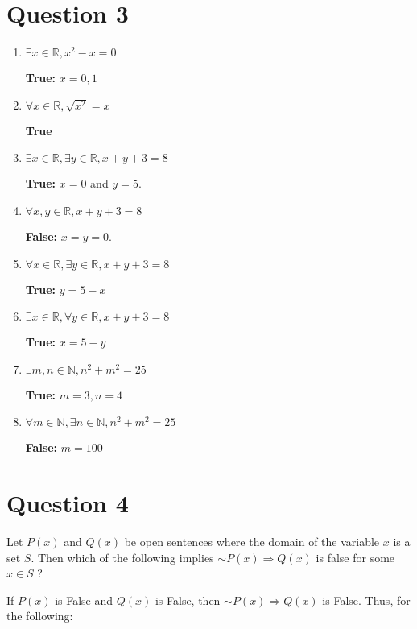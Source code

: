 \documentclass[11pt, oneside]{article}   	%
\begin{document}
\section*{Question 3}

\begin{enumerate}[ (a)]    

	\item $\exists x \in \mathbb{R}, x^2-x=0$
	
	\textbf{True:} $x=0, 1$
	
	\item $\forall x \in \mathbb{R}, \sqrt{x^2} = x$
	
	\textbf{True}
	
	\item $\exists x \in \mathbb{R}, \exists y \in \mathbb{R}, x+y+3=8$
	
	\textbf{True:} $x=0$ and  $y=5$.
	
	\item $\forall x,y \in \mathbb{R}, x+y+3=8$
	
	\textbf{False:} $x = y = 0$.
	
	\item$\forall x \in \mathbb{R}, \exists y \in \mathbb{R}, x+y+3=8$
	
	\textbf{True:} $y = 5-x$
	
	\item $\exists x \in \mathbb{R}, \forall y \in \mathbb{R}, x+y+3 =8$
	
	\textbf{True:} $x = 5-y$
	
	\item $\exists m,n \in \mathbb{N}, n^2+m^2 =25$
	
	\textbf{True:} $m=3, n=4$
	
	\item $\forall m \in \mathbb{N}, \exists n \in \mathbb{N}, n^2+m^2=25$
	
	\textbf{False:} $m=100$

\end{enumerate}

\section*{Question 4}

Let $P(x)$ and $Q(x)$ be open sentences where the domain of the variable $x$ is a set $S$. Then which of the following implies $\sim P(x) \Rightarrow Q(x)$ is false for some $x \in S$ ?

If $P(x)$ is False and $Q(x)$ is False, then $\sim P(x) \Rightarrow Q(x)$ is False. Thus, for the following:
\end{document}
